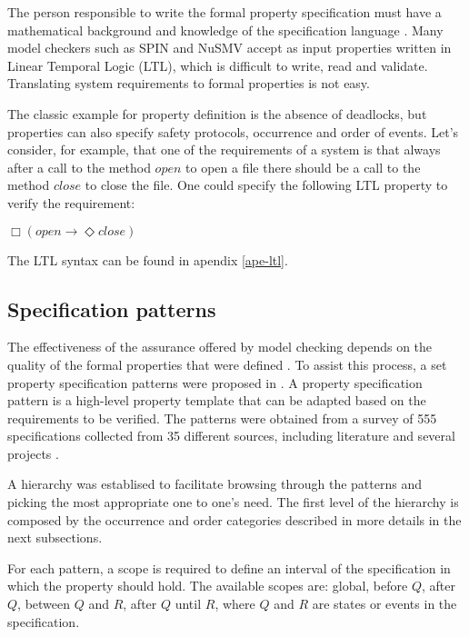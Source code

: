 The person responsible to write the formal property specification must have a mathematical background and knowledge of the specification language \cite{Prospec}. Many model checkers such as SPIN and NuSMV accept as input properties written in Linear Temporal Logic (LTL), which is difficult to write, read and validate. Translating system requirements to formal properties is not easy.

The classic example for property definition is the absence of deadlocks, but properties can also specify safety protocols\cite{Merz}, occurrence and order of events. Let's consider, for example, that one of the requirements of a system is that always after a call to the method $open$ to open a file there should be a call to the method $close$ to close the file. One could specify the following LTL property to verify the requirement:

\begin{center}
$\Box (open \rightarrow \Diamond close)$
\end{center}

The LTL syntax can be found in apendix \ref{ape-ltl}.

\subsection{Specification patterns}
\label{specpatterns}

The effectiveness of the assurance offered by model checking depends on the quality of the formal properties that were defined \cite{Prospec}. To assist this process, a set property specification patterns were proposed in \cite{dwyer98}. A property specification pattern is a high-level property template that can be adapted based on the requirements to be verified. The patterns were obtained from a survey of 555 specifications collected from 35 different sources, including literature and several projects \cite{dwyer99:specpatt_survey}.

A hierarchy was establised to facilitate browsing through the patterns and picking the most appropriate one to one's need. The first level of the hierarchy is composed by the occurrence and order categories described in more details in the next subsections.

For each pattern, a scope is required to define an interval of the specification in which the property should hold. The available scopes are: global, before $Q$, after $Q$, between $Q$ and $R$, after $Q$ until $R$, where $Q$ and $R$ are states or events in the specification.

